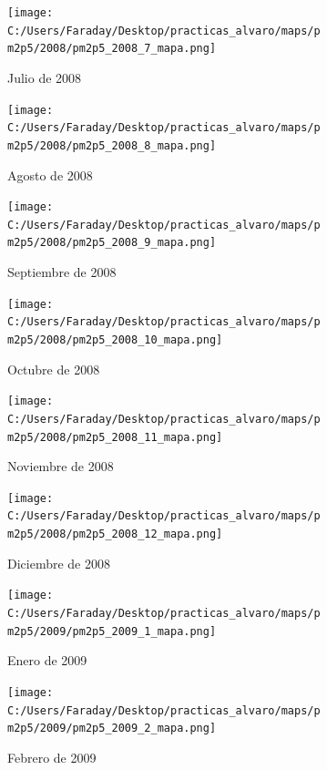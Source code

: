 \documentclass[12pt]{article}
\begin{document}
\newpage

\begin{figure}[H]
\centering
\begin{subfigure}[h]{0.45\textwidth}
\texttt{[image: C:/Users/Faraday/Desktop/practicas\_alvaro/maps/pm2p5/2008/pm2p5\_2008\_7\_mapa.png]}
\caption{Julio de 2008}
\label{fig:map-mon-4-7-2008}
\end{subfigure}
%
\begin{subfigure}[H]{0.45\textwidth}
\texttt{[image: C:/Users/Faraday/Desktop/practicas\_alvaro/maps/pm2p5/2008/pm2p5\_2008\_8\_mapa.png]}
\caption{Agosto de 2008}
\label{fig:map-mon-4-8-2008}
\end{subfigure}
\caption{}
\end{figure}

\begin{figure}[H]
\centering
\begin{subfigure}[h]{0.45\textwidth}
\texttt{[image: C:/Users/Faraday/Desktop/practicas\_alvaro/maps/pm2p5/2008/pm2p5\_2008\_9\_mapa.png]}
\caption{Septiembre de 2008}
\label{fig:map-mon-4-9-2008}
\end{subfigure}
%
\begin{subfigure}[H]{0.45\textwidth}
\texttt{[image: C:/Users/Faraday/Desktop/practicas\_alvaro/maps/pm2p5/2008/pm2p5\_2008\_10\_mapa.png]}
\caption{Octubre de 2008}
\label{fig:map-mon-4-10-2008}
\end{subfigure}
\caption{}
\end{figure}

\begin{figure}[H]
\centering
\begin{subfigure}[h]{0.45\textwidth}
\texttt{[image: C:/Users/Faraday/Desktop/practicas\_alvaro/maps/pm2p5/2008/pm2p5\_2008\_11\_mapa.png]}
\caption{Noviembre de 2008}
\label{fig:map-mon-4-11-2008}
\end{subfigure}
%
\begin{subfigure}[H]{0.45\textwidth}
\texttt{[image: C:/Users/Faraday/Desktop/practicas\_alvaro/maps/pm2p5/2008/pm2p5\_2008\_12\_mapa.png]}
\caption{Diciembre de 2008}
\label{fig:map-mon-4-12-2008}
\end{subfigure}
\caption{}
\end{figure}

\newpage

\begin{figure}[H]
\centering
\begin{subfigure}[h]{0.45\textwidth}
\texttt{[image: C:/Users/Faraday/Desktop/practicas\_alvaro/maps/pm2p5/2009/pm2p5\_2009\_1\_mapa.png]}
\caption{Enero de 2009}
\label{fig:map-mon-4-1-2009}
\end{subfigure}
%
\begin{subfigure}[H]{0.45\textwidth}
\texttt{[image: C:/Users/Faraday/Desktop/practicas\_alvaro/maps/pm2p5/2009/pm2p5\_2009\_2\_mapa.png]}
\caption{Febrero de 2009}
\label{fig:map-mon-4-2-2009}
\end{subfigure}
\caption{}
\end{figure}
\end{document}
